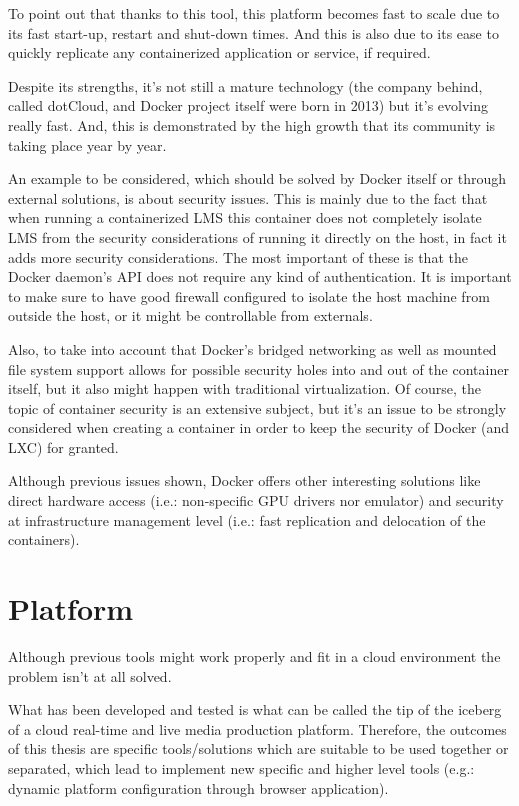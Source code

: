 To point out that thanks to this tool, this platform becomes fast to scale due to its fast start-up, restart and shut-down times. And this is also due to its ease to quickly replicate any containerized application or service, if required. 

Despite its strengths, it's not still a mature technology (the company behind, called dotCloud, and Docker project itself were born in 2013) but it's evolving really fast. And, this is demonstrated by the high growth that its community is taking place year by year. 

An example to be considered, which should be solved by Docker itself or through external solutions, is about security issues. This is mainly due to the fact that when running a containerized LMS this container does not completely isolate LMS from the security considerations of running it directly on the host, in fact it adds more security considerations. The most important of these is that the Docker daemon's API does not require any kind of authentication. It is important to make sure to have good firewall configured to isolate the host machine from outside the host, or it might be controllable from externals. 

Also, to take into account that Docker's bridged networking as well as mounted file system support allows for possible security holes into and out of the container itself, but it also might happen with traditional virtualization. Of course, the topic of container security is an extensive subject, but it's an issue to be strongly considered when creating a container in order to keep the security of Docker (and LXC) for granted.

Although previous issues shown, Docker offers other interesting solutions like direct hardware access (i.e.: non-specific GPU drivers nor emulator) and security at infrastructure management level (i.e.: fast replication and delocation of the containers). 

\section{Platform}

Although previous tools might work properly and fit in a cloud environment the problem isn't at all solved. 

What has been developed and tested is what can be called the tip of the iceberg of a cloud real-time and live media production platform. Therefore, the outcomes of this thesis are specific tools/solutions which are suitable to be used together or separated, which lead to implement new specific and higher level tools (e.g.: dynamic platform configuration through browser application). 

